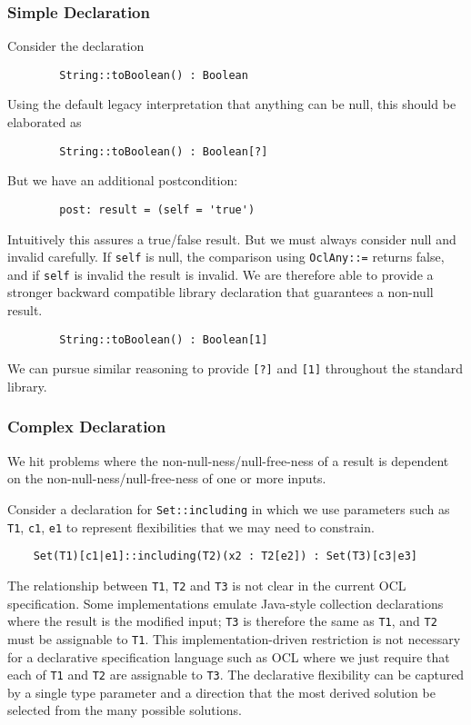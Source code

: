 \documentclass{llncs}
\begin{document}
\subsubsection{Simple Declaration}

Consider the declaration
\begin{verbatim}
        String::toBoolean() : Boolean
\end{verbatim}
Using the default legacy interpretation that anything can be null, this should be elaborated as
\begin{verbatim}
        String::toBoolean() : Boolean[?]
\end{verbatim}
But we have an additional postcondition:
\begin{verbatim}
        post: result = (self = 'true')
\end{verbatim}

Intuitively this assures a true/false result. But we must always consider null and invalid carefully. If \verb$self$ is null, the comparison using \verb$OclAny::=$ returns false, and if \verb$self$ is invalid the result is invalid. We are therefore able to provide a stronger backward compatible library declaration that guarantees a non-null result.
\begin{verbatim}
        String::toBoolean() : Boolean[1]
\end{verbatim}

We can pursue similar reasoning to provide \verb$[?]$ and \verb$[1]$ throughout the standard library.

\subsubsection{Complex Declaration}

We hit problems where the non-null-ness/null-free-ness of a result is dependent on the non-null-ness/null-free-ness of one or more inputs.

Consider a declaration for  \verb$Set::including$ in which we use parameters such as \verb$T1$, \verb$c1$, \verb$e1$ to represent flexibilities that we may need to constrain.
\begin{verbatim}
    Set(T1)[c1|e1]::including(T2)(x2 : T2[e2]) : Set(T3)[c3|e3]
\end{verbatim}

The relationship between \verb$T1$, \verb$T2$ and \verb$T3$ is not clear in the current OCL specification. Some implementations emulate Java-style collection declarations where the result is the modified input; \verb$T3$ is therefore the same as \verb$T1$, and \verb$T2$ must be assignable to \verb$T1$. This implementation-driven  restriction is not necessary for a declarative specification language such as OCL where we just require that each of \verb$T1$ and \verb$T2$ are assignable to \verb$T3$. The declarative flexibility can be captured by a single type parameter and a direction that the most derived solution be selected from the many possible solutions.
\end{document}
